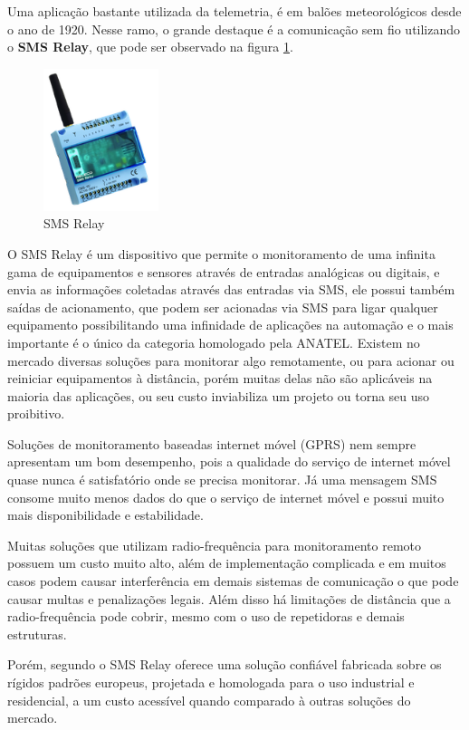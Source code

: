 	Uma aplicação bastante utilizada da telemetria, é em balões meteorológicos desde o ano de 1920. Nesse ramo, o grande destaque é a comunicação sem fio utilizando o \textbf{SMS Relay}, que pode ser observado na figura \ref{img:telemetria}.

	\begin{figure}[H]
		\centering
		\includegraphics[width=0.3\textwidth]{figuras/telemetria}
		\caption{SMS Relay }
		\label{img:telemetria}
	\end{figure}

	O SMS Relay é um dispositivo que permite o monitoramento de uma infinita gama de equipamentos e sensores através de entradas analógicas ou digitais, e envia as informações coletadas através das entradas via SMS, ele possui também saídas de acionamento, que podem ser acionadas via SMS para ligar qualquer equipamento possibilitando uma infinidade de aplicações na automação e o mais importante é o único da categoria homologado pela ANATEL. Existem no mercado diversas soluções para monitorar algo remotamente, ou para acionar ou reiniciar equipamentos à distância, porém muitas delas não são aplicáveis na maioria das aplicações, ou seu custo inviabiliza um projeto ou torna seu uso proibitivo.

	Soluções de monitoramento baseadas internet móvel (GPRS) nem sempre apresentam um bom desempenho, pois a qualidade do serviço de internet móvel quase nunca é satisfatório onde se precisa monitorar. Já uma mensagem SMS consome muito menos dados do que o serviço de internet móvel e possui muito mais disponibilidade e estabilidade.

	Muitas soluções que utilizam radio-frequência para monitoramento remoto possuem um custo muito alto, além de implementação complicada e em muitos casos podem causar interferência em demais sistemas de comunicação o que pode causar multas e penalizações legais. Além disso há limitações de distância que a radio-frequência pode cobrir, mesmo com o uso de repetidoras e demais estruturas.

	Porém, segundo  o SMS Relay oferece uma solução confiável fabricada sobre os rígidos padrões europeus, projetada e homologada para o uso industrial e residencial, a um custo acessível quando comparado à outras soluções do mercado.

